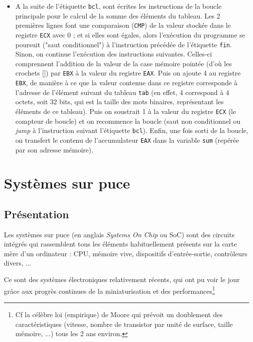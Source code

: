 \documentclass[11pt,a4paper,french,twoside]{PMCours}
\begin{document}
\begin{itemize}
\item A la suite de l'étiquette \verb'bcl', sont écrites les instructions de la boucle principale pour le calcul de la somme des éléments du tableau. Les 2 premières lignes font une comparaison (\verb'CMP') de la valeur stockée dans le registre \verb'ECX' avec 0 ; et si elles sont égales, alors l'exécution du programme se poursuit ("saut conditionnel") à l'instruction précédée de l'étiquette \verb'fin'. Sinon, on continue l'exécution des instructions suivantes. Celles-ci comprennent l'addition de la valeur de la case mémoire pointée (d'où les crochets []) par \verb'EBX' à la valeur du registre \verb'EAX'. Puis on ajoute 4 au registre \verb'EBX', de manière à ce que la valeur contenue dans ce registre corresponde à l'adresse de l'élément suivant du tableau \verb'tab' (en effet, 4 correspond à 4 octets, soit 32 bits, qui est la taille des mots binaires, représentant les éléments de ce tableau). Puis on soustrait 1 à la valeur du registre \verb'ECX' (le compteur de boucle) et on recommence la boucle (saut non conditionnel ou \emph{jump} à l'instruction suivant l'étiquette \verb'bcl'). Enfin, une fois sorti de la boucle, on transfert le contenu de l'accumulateur \verb'EAX' dans la variable \verb'sum' (repérée par son adresse mémoire).
\end{itemize}



\section{Systèmes sur puce}

\subsection{Présentation}


\begin{Definition}{}
Les systèmes sur puce (en anglais \emph{Systems On Chip} ou SoC) sont des circuits intégrés qui rassemblent tous les éléments habituellement présents sur la carte mère d'un ordinateur : CPU, mémoire vive, dispositifs d'entrée-sortie, contrôleurs divers, ... 
\end{Definition}

Ce sont des systèmes électroniques relativement récents, qui ont pu voir le jour grâce aux progrès continues de la miniaturisation et des performances\footnote{Cf la célèbre loi (empirique) de Moore qui prévoit un doublement des caractéristiques (vitesse, nombre de transistor par unité de surface, taille mémoire, ...) tous les 2 ans environ.}
\end{document}
